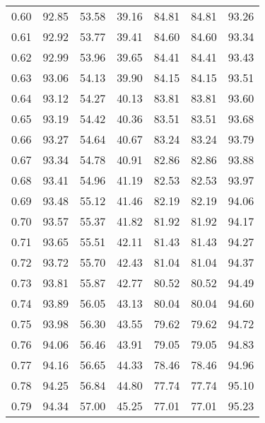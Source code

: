 \begin{tabular}{|c|c|c|c|c|c|c|}
      0.60 &     92.85 &     53.58 &      39.16 &   84.81 &      84.81 &         93.26 \\
      0.61 &     92.92 &     53.77 &      39.41 &   84.60 &      84.60 &         93.34 \\
      0.62 &     92.99 &     53.96 &      39.65 &   84.41 &      84.41 &         93.43 \\
      0.63 &     93.06 &     54.13 &      39.90 &   84.15 &      84.15 &         93.51 \\
      0.64 &     93.12 &     54.27 &      40.13 &   83.81 &      83.81 &         93.60 \\
      0.65 &     93.19 &     54.42 &      40.36 &   83.51 &      83.51 &         93.68 \\
      0.66 &     93.27 &     54.64 &      40.67 &   83.24 &      83.24 &         93.79 \\
      0.67 &     93.34 &     54.78 &      40.91 &   82.86 &      82.86 &         93.88 \\
      0.68 &     93.41 &     54.96 &      41.19 &   82.53 &      82.53 &         93.97 \\
      0.69 &     93.48 &     55.12 &      41.46 &   82.19 &      82.19 &         94.06 \\
      0.70 &     93.57 &     55.37 &      41.82 &   81.92 &      81.92 &         94.17 \\
      0.71 &     93.65 &     55.51 &      42.11 &   81.43 &      81.43 &         94.27 \\
      0.72 &     93.72 &     55.70 &      42.43 &   81.04 &      81.04 &         94.37 \\
      0.73 &     93.81 &     55.87 &      42.77 &   80.52 &      80.52 &         94.49 \\
      0.74 &     93.89 &     56.05 &      43.13 &   80.04 &      80.04 &         94.60 \\
      0.75 &     93.98 &     56.30 &      43.55 &   79.62 &      79.62 &         94.72 \\
      0.76 &     94.06 &     56.46 &      43.91 &   79.05 &      79.05 &         94.83 \\
      0.77 &     94.16 &     56.65 &      44.33 &   78.46 &      78.46 &         94.96 \\
      0.78 &     94.25 &     56.84 &      44.80 &   77.74 &      77.74 &         95.10 \\
      0.79 &     94.34 &     57.00 &      45.25 &   77.01 &      77.01 &         95.23 \\

\end{tabular}
